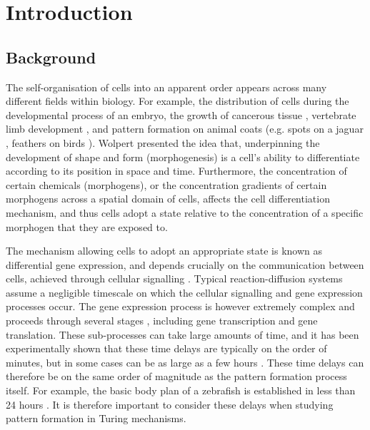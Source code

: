 \chapter{Introduction}

\section{Background}\label{section:background}

The self-organisation of cells into an apparent order appears across many different fields within biology. For example, the distribution of cells during the developmental process of an embryo, the growth of cancerous tissue \cite{morph}, vertebrate limb development \cite{miura1,glimm,miura2}, and pattern formation on animal coats (e.g. spots on a jaguar \cite{painter}, feathers on birds \cite{bailleul}). Wolpert \cite{wolpert} presented the idea that, underpinning the development of shape and form (morphogenesis) is a cell's ability to differentiate according to its position in space and time. Furthermore, the concentration of certain chemicals (morphogens), or the concentration gradients of certain morphogens across a spatial domain of cells, affects the cell differentiation mechanism, and thus cells adopt a state relative to the concentration of a specific morphogen that they are exposed to.

The mechanism allowing cells to adopt an appropriate state is known as differential gene expression, and depends crucially on the communication between cells, achieved through cellular signalling \cite{gaffmonk}. Typical reaction-diffusion systems assume a negligible timescale on which the cellular signalling and gene expression processes occur. The gene expression process is however extremely complex and proceeds through several stages \cite{gaffmonk}, including gene transcription and gene translation. These sub-processes can take large amounts of time, and it has been experimentally shown that these time delays are typically on the order of minutes, but in some cases can be as large as a few hours \cite{gaffmonk,tennyson}. These time delays can therefore be on the same order of magnitude as the pattern formation process itself. For example, the basic body plan of a zebrafish is established in less than 24 hours \cite{gaffmonk,kimmel}. It is therefore important to consider these delays when studying pattern formation in Turing mechanisms.

